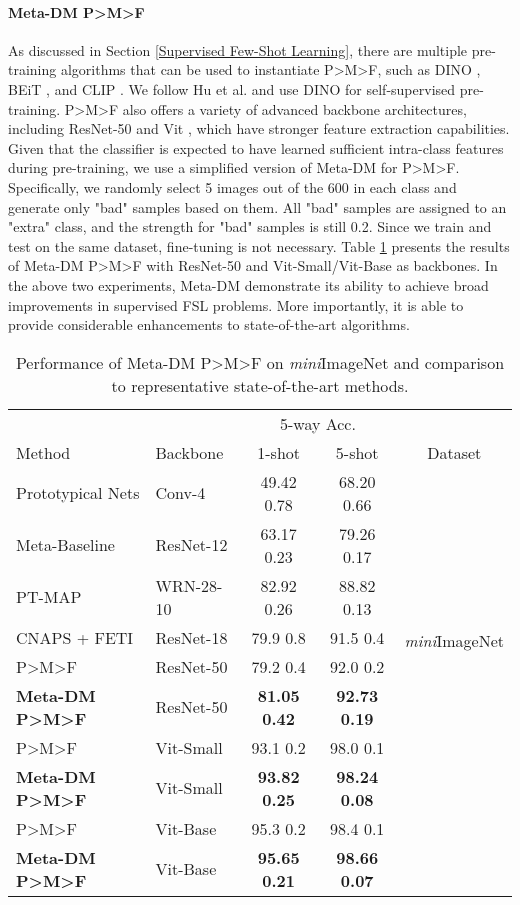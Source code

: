 \documentclass{article}
\begin{document}
\paragraph{Meta-DM  P>M>F} As discussed in Section \ref{Supervised Few-Shot Learning}, there are multiple pre-training algorithms that can be used to instantiate P>M>F, such as DINO \cite{i24}, BEiT \cite{i47}, and CLIP \cite{i48}. We follow Hu et al. and use DINO for self-supervised pre-training. P>M>F also offers a variety of advanced backbone architectures, including ResNet-50 \cite{i46} and Vit \cite{i29}, which have stronger feature extraction capabilities. Given that the classifier is expected to have learned sufficient intra-class features during pre-training, we use a simplified version of Meta-DM for P>M>F. Specifically, we randomly select 5 images out of the 600 in each class and generate only "bad" samples based on them. All "bad" samples are assigned to an "extra" class, and the strength for "bad" samples is still 0.2. Since we train and test on the same dataset, fine-tuning is not necessary. Table \ref{table2} presents the results of Meta-DM  P>M>F with ResNet-50 and Vit-Small/Vit-Base as backbones. In the above two experiments, Meta-DM demonstrate its ability to achieve broad improvements in supervised FSL problems. More importantly, it is able to provide considerable enhancements to state-of-the-art algorithms.


\begin{table}
	\caption{Performance of Meta-DM  P>M>F on \textit{mini}ImageNet and comparison to representative state-of-the-art methods. }
	\centering
	\begin{tabular}{llccc}
		\toprule
		 & & \multicolumn{2}{c}{5-way Acc.} &  \\
		Method  & Backbone   & 1-shot     & 5-shot & Dataset \\
		\midrule
		Prototypical Nets \cite{i1} & Conv-4 & 49.42  0.78  & 68.20  0.66  &  \multirow{8}{*}{\textit{mini}ImageNet}    \\
		Meta-Baseline \cite{i38} & ResNet-12     & 63.17  0.23 & 79.26  0.17  &     \\
		PT-MAP \cite{i39} & WRN-28-10 & 82.92  0.26    & 88.82  0.13  &  \\
		CNAPS + FETI \cite{i40} & ResNet-18 & 79.9  0.8  & 91.5  0.4  &  \\
		\cmidrule(r){1-4}
		P>M>F \cite{i7} & ResNet-50 & 79.2  0.4  & 92.0  0.2  &  \\
		\textbf{Meta-DM  P>M>F} & ResNet-50 & \textbf{81.05  0.42}  &  \textbf{ 92.73  0.19 } &  \\
		P>M>F \cite{i7} & Vit-Small & 93.1  0.2  & 98.0  0.1  &  \\
		\textbf{Meta-DM  P>M>F} & Vit-Small & \textbf{93.82  0.25}  &  \textbf{ 98.24  0.08 } &  \\
		P>M>F  & Vit-Base & 95.3  0.2  & 98.4  0.1  &  \\
		\textbf{Meta-DM  P>M>F} & Vit-Base & \textbf{95.65  0.21}  &  \textbf{ 98.66  0.07 } &  \\
		\bottomrule
	\end{tabular}
	\label{table2}
\end{table}
\end{document}
